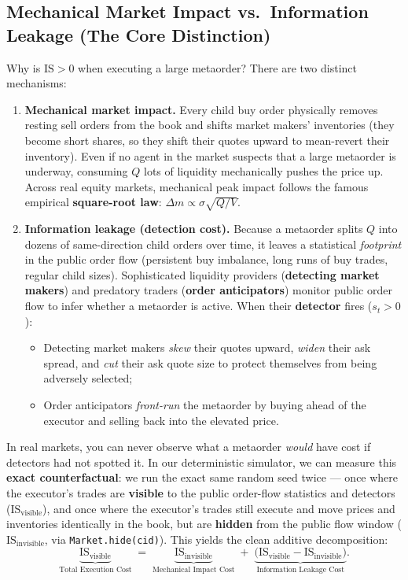\documentclass[11pt,a4paper]{article}
\newcommand{\code}[1]{\texttt{#1}}
\begin{document}
\subsection{Mechanical Market Impact vs.\ Information Leakage (The Core Distinction)}

Why is $\text{IS} > 0$ when executing a large metaorder? There are two distinct mechanisms:
\begin{enumerate}[nosep]
\item \textbf{Mechanical market impact.} Every child buy order physically removes resting sell orders
  from the book and shifts market makers' inventories (they become short shares, so they shift their
  quotes upward to mean-revert their inventory). Even if no agent in the market suspects that a large
  metaorder is underway, consuming $Q$ lots of liquidity mechanically pushes the price up. Across
  real equity markets, mechanical peak impact follows the famous empirical \textbf{square-root law}:
  $\Delta m \propto \sigma\sqrt{Q/V}$.
\item \textbf{Information leakage (detection cost).} Because a metaorder splits $Q$ into dozens of
  same-direction child orders over time, it leaves a statistical \emph{footprint} in the public order
  flow (persistent buy imbalance, long runs of buy trades, regular child sizes). Sophisticated
  liquidity providers (\textbf{detecting market makers}) and predatory traders (\textbf{order
  anticipators}) monitor public order flow to infer whether a metaorder is active. When their
  \textbf{detector} fires ($s_t > 0$):
  \begin{itemize}[nosep]
  \item Detecting market makers \emph{skew} their quotes upward, \emph{widen} their ask spread, and
    \emph{cut} their ask quote size to protect themselves from being adversely selected;
  \item Order anticipators \emph{front-run} the metaorder by buying ahead of the executor and selling
    back into the elevated price.
  \end{itemize}
\end{enumerate}

In real markets, you can never observe what a metaorder \emph{would} have cost if detectors had not
spotted it. In our deterministic simulator, we can measure this \textbf{exact counterfactual}: we run
the exact same random seed twice --- once where the executor's trades are \textbf{visible} to the public
order-flow statistics and detectors ($\text{IS}_{\text{visible}}$), and once where the executor's trades
still execute and move prices and inventories identically in the book, but are \textbf{hidden} from the
public flow window ($\text{IS}_{\text{invisible}}$, via \code{Market.hide(cid)}). This yields the clean
additive decomposition:
\begin{equation}
  \label{eq:leakage_decomp}
  \underbrace{\text{IS}_{\text{visible}}}_{\text{Total Execution Cost}}
  \;=\;
  \underbrace{\text{IS}_{\text{invisible}}}_{\text{Mechanical Impact Cost}}
  \;+\;
  \underbrace{\big(\text{IS}_{\text{visible}} - \text{IS}_{\text{invisible}}\big)}_{\text{Information Leakage Cost}}.
\end{equation}
\end{document}
